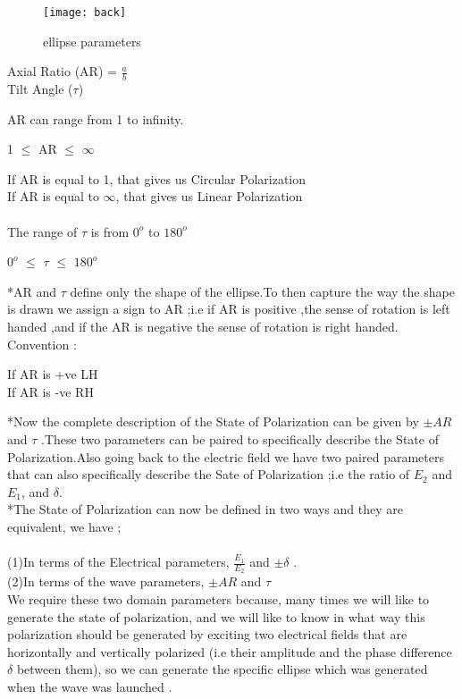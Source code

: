 \begin{figure}
	\centering
	\texttt{[image: back]}
	\caption{ellipse parameters}
\end{figure}
\begin{center}
	Axial Ratio (AR) = $\frac{a}{b}$
\\	Tilt Angle ($\tau$)
\end{center}
AR can range from 1 to infinity.\begin{center}
	 1 $\leq $ AR $\leq $ $\infty $
\end{center}
 If AR is equal to 1, that gives us Circular Polarization
\\ If AR is equal to $\infty$, that gives us Linear Polarization\\
\\ The range of $\tau $ is from $0^{o}$ to $180^{o}$ \begin{center}
	 $0^{o}$ $\leq $ $\tau $ $\leq $ $180^{o} $
\end{center}
*AR and $\tau $ define only the shape of the ellipse.To then capture the way the shape is drawn we assign a sign to AR ;i.e if AR is positive ,the sense of rotation is left handed ,and if the AR is negative the sense of rotation is right handed.\\
Convention :\begin{center}
	If AR is +ve   LH
	\\If AR is -ve   RH
\end{center}
*Now the complete description of the State of Polarization can be given by $\pm AR$ and $\tau $ .These two parameters can be paired to specifically describe the State of Polarization.Also going back to the electric field we have two paired parameters that can also specifically describe the Sate of Polarization ;i.e the ratio of $ E_2 $ and $ E_1 $, and $\delta $.
\\*The State of Polarization can now be defined in two ways and they are equivalent, we have ;\\
\\(1)In terms of the Electrical parameters, $\frac{E_1}{E_2}$ and $\pm \delta $ .
\\(2)In terms of the wave parameters, $\pm AR $ and $\tau $
\\
We require these two domain parameters because, many times we will like to generate the state of polarization, and we will like to know in what way this polarization should be generated by exciting two electrical fields that are horizontally and vertically polarized (i.e their amplitude and the phase difference $\delta $ between them), so we can generate the specific ellipse which was generated when the wave was launched .
